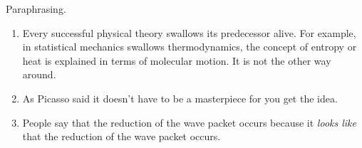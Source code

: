 \documentclass{article}
\begin{document}
Paraphrasing.

\begin{enumerate}
\item
Every successful physical theory swallows its predecessor alive.
For example, in statistical mechanics swallows thermodynamics, the concept of entropy or heat is explained in terms of molecular motion. It is not the other way around.

\item
As Picasso said it doesn't have to be a masterpiece for you get the idea.

\item
People say that the reduction of the wave packet occurs because it \emph{looks like}
that the reduction of the wave packet occurs.
\end{enumerate}
\end{document}
